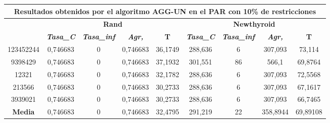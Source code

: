 \documentclass[12pt, spanish]{article}
\begin{document}
\begin{table}[H]
\footnotesize

\begin{tabular}{|c|c|c|c|c|c|c|c|c|}
\hline
\multicolumn{9}{|c|}{\textbf{Resultados obtenidos por el algoritmo AGG-UN en el PAR con 10\% de restricciones}}                                                                                                   \\ \hline
\multirow{2}{*}{} & \multicolumn{4}{c|}{\textbf{Rand}}                                                            & \multicolumn{4}{c|}{\textbf{Newthyroid}}                                                      \\ \cline{2-9} 
                  & \textit{\textbf{Tasa\_C}} & \textit{\textbf{Tasa\_inf}} & \textit{\textbf{Agr,}} & \textbf{T} & \textit{\textbf{Tasa\_C}} & \textit{\textbf{Tasa\_inf}} & \textit{\textbf{Agr,}} & \textbf{T} \\ \hline
123452244         & 0,746683                  & 0                           & 0,746683               & 36,1749    & 288,636                   & 6                           & 307,093                & 73,114     \\ \hline
9398429           & 0,746683                  & 0                           & 0,746683               & 37,1932    & 301,551                   & 86                          & 566,1                  & 69,8764    \\ \hline
12321             & 0,746683                  & 0                           & 0,746683               & 32,1782    & 288,636                   & 6                           & 307,093                & 72,5568    \\ \hline
213566            & 0,746683                  & 0                           & 0,746683               & 30,2733    & 288,636                   & 6                           & 307,093                & 67,1617    \\ \hline
3939021           & 0,746683                  & 0                           & 0,746683               & 30,2733    & 288,636                   & 6                           & 307,093                & 66,7465    \\ \hline
\textbf{Media}    & 0,746683                  & 0                           & 0,746683               & 32,4795    & 291,219                   & 22                          & 358,8944               & 69,89108   \\ \hline
\end{tabular}
\end{table}
\end{document}
